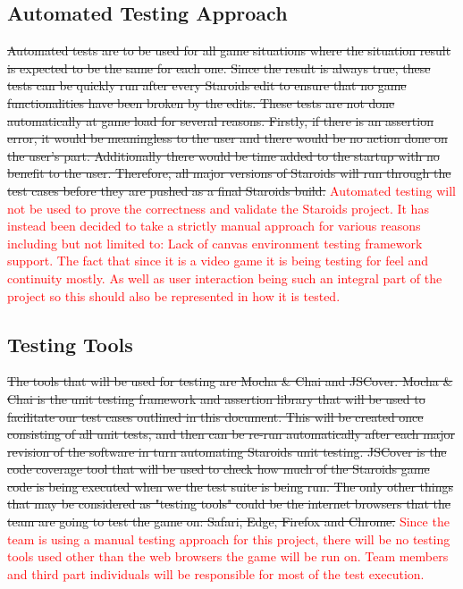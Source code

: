 \documentclass[12pt, titlepage]{article}
\begin{document}
\subsection{Automated Testing Approach}
\sout{Automated tests are to be used for all game situations where the situation result is expected to be the same for each one. Since the result is always true, these tests can be quickly run after every Staroids edit to ensure that no game functionalities have been broken by the edits. These tests are not done automatically at game load for several reasons. Firstly, if there is an assertion error, it would be meaningless to the user and there would be no action done on the user's part. Additionally there would be time added to the startup with no benefit to the user. Therefore, all major versions of Staroids will run through the test cases before they are pushed as a final Staroids build.}
\textcolor{red}{Automated testing will not be used to prove the correctness and validate the Staroids project. It has instead been decided to take a strictly manual approach for various reasons including but not limited to: Lack of canvas environment testing framework support. The fact that since it is a video game it is being testing for feel and continuity mostly. As well as user interaction being such an integral part of the project so this should also be represented in how it is tested.}

\subsection{Testing Tools}
\sout{The tools that will be used for testing are Mocha \& Chai and JSCover. Mocha \& Chai is the unit testing framework and assertion library that will be used to facilitate our test cases outlined in this document. This will be created once consisting of all unit tests, and then can be re-run automatically after each major revision of the software in turn automating Staroids unit testing. JSCover is the code coverage tool that will be used to check how much of the Staroids game code is being executed when we the test suite is being run. The only other things that may be considered as "testing tools" could be the internet browsers that the team are going to test the game on: Safari, Edge, Firefox and Chrome.}
\textcolor{red}{Since the team is using a manual testing approach for this project, there will be no testing tools used other than the web browsers the game will be run on. Team members and third part individuals will be responsible for most of the test execution.}
\end{document}
